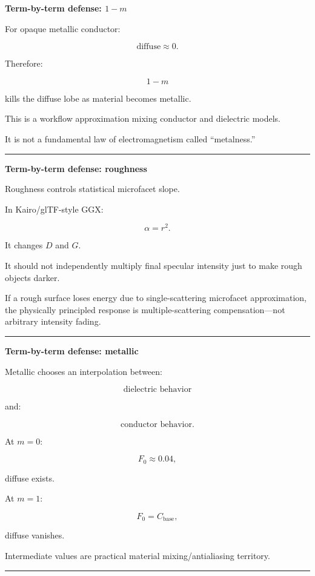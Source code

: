 \textbf{Term-by-term defense: \(1-m\)}

For opaque metallic conductor:

\[
\text{diffuse}\approx0.
\]

Therefore:

\[
1-m
\]

kills the diffuse lobe as material becomes metallic.

This is a workflow approximation mixing conductor and dielectric models.

It is not a fundamental law of electromagnetism called ``metalness.''

\begin{center}\rule{0.5\linewidth}{0.5pt}\end{center}

\textbf{Term-by-term defense: roughness}

Roughness controls statistical microfacet slope.

In Kairo/glTF-style GGX:

\[
\alpha=r^2.
\]

It changes \(D\) and \(G\).

It should not independently multiply final specular intensity just to make rough objects darker.

If a rough surface loses energy due to single-scattering microfacet approximation, the physically principled response is multiple-scattering compensation---not arbitrary intensity fading.

\begin{center}\rule{0.5\linewidth}{0.5pt}\end{center}

\textbf{Term-by-term defense: metallic}

Metallic chooses an interpolation between:

\[
\text{dielectric behavior}
\]

and:

\[
\text{conductor behavior}.
\]

At \(m=0\):

\[
F_0\approx0.04,
\]

diffuse exists.

At \(m=1\):

\[
F_0=C_{\text{base}},
\]

diffuse vanishes.

Intermediate values are practical material mixing/antialiasing territory.

\begin{center}\rule{0.5\linewidth}{0.5pt}\end{center}

